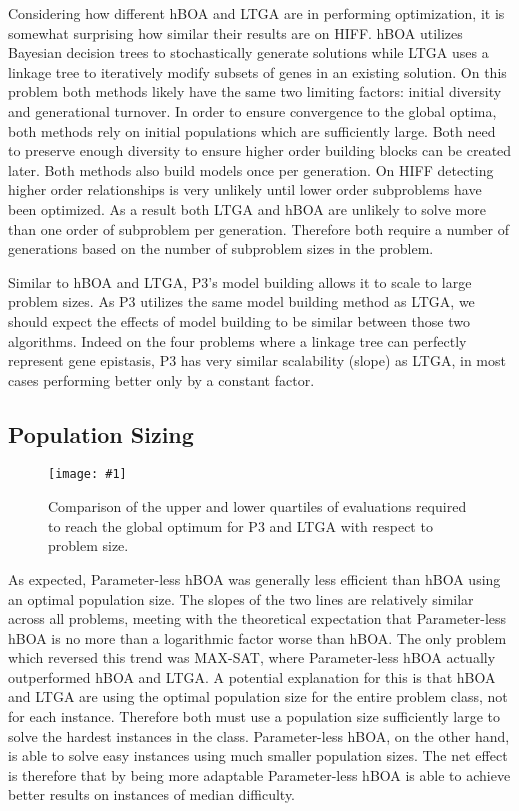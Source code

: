 \documentclass[twoside]{article}
\newcommand{\includegraphicsfit}[1]
{\texttt{[image: \#1]}}
\begin{document}
Considering how different hBOA and LTGA are in performing optimization, it is somewhat surprising how similar
their results are on HIFF. hBOA utilizes Bayesian decision trees to stochastically generate solutions while
LTGA uses a linkage tree to iteratively modify subsets of genes in an existing solution. On this problem both
methods likely have the same two limiting factors: initial diversity and generational turnover. In order to
ensure convergence to the global optima, both methods rely on initial populations which are sufficiently large.
Both need to preserve enough diversity to ensure higher order building blocks can be created later. Both methods
also build models once per generation. On HIFF detecting higher order relationships is very unlikely until lower
order subproblems have been optimized. As a result both LTGA and hBOA are unlikely to solve more than one order
of subproblem per generation. Therefore both require a number of generations based on the number of subproblem sizes
in the problem.

Similar to hBOA and LTGA, P3's model building allows it to scale to large problem sizes. As P3 utilizes the same
model building method as LTGA, we should expect the effects of model building to be similar between those two algorithms.
Indeed on the four problems where a linkage tree can perfectly represent gene epistasis, P3 has very similar
scalability (slope) as LTGA, in most cases performing better only by a constant factor.

\subsection{Population Sizing}
\begin{figure}
  \begin{center}
  \includegraphicsfit{evals-to-success-range}
  \end{center}
  \caption{Comparison of the upper and lower quartiles of evaluations required
           to reach the global optimum for P3 and LTGA with respect to problem size.}
  \label{fig-evals-to-success-range}
\end{figure}

As expected, Parameter-less hBOA was generally less efficient than hBOA using an optimal population size. The slopes
of the two lines are relatively similar across all problems, meeting with the theoretical expectation that
Parameter-less hBOA is no more than a logarithmic factor worse than hBOA.  The only problem which reversed
this trend was MAX-SAT, where Parameter-less hBOA actually outperformed hBOA and LTGA. A potential explanation for
this is that hBOA and LTGA are using the optimal population size for the entire problem class, not for each instance.
Therefore both must use a population size sufficiently large to solve the hardest instances in the class.
Parameter-less hBOA, on the other hand, is able to solve easy instances using much smaller population sizes.
The net effect is therefore that by being more adaptable Parameter-less hBOA is able to achieve better results
on instances of median difficulty.
\end{document}
